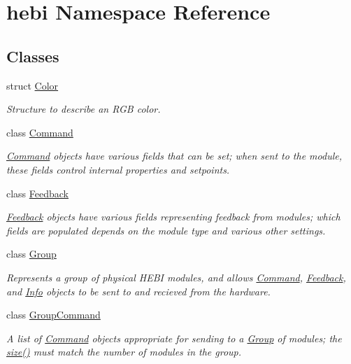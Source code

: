 \hypertarget{namespacehebi}{}\section{hebi Namespace Reference}
\label{namespacehebi}
\subsection*{Classes}
\begin{DoxyCompactItemize}
\item 
struct \hyperlink{structhebi_1_1Color}{Color}
\begin{DoxyCompactList}\small\item\em Structure to describe an R\+GB color. \end{DoxyCompactList}\item 
class \hyperlink{classhebi_1_1Command}{Command}
\begin{DoxyCompactList}\small\item\em \hyperlink{classhebi_1_1Command}{Command} objects have various fields that can be set; when sent to the module, these fields control internal properties and setpoints. \end{DoxyCompactList}\item 
class \hyperlink{classhebi_1_1Feedback}{Feedback}
\begin{DoxyCompactList}\small\item\em \hyperlink{classhebi_1_1Feedback}{Feedback} objects have various fields representing feedback from modules; which fields are populated depends on the module type and various other settings. \end{DoxyCompactList}\item 
class \hyperlink{classhebi_1_1Group}{Group}
\begin{DoxyCompactList}\small\item\em Represents a group of physical H\+E\+BI modules, and allows \hyperlink{classhebi_1_1Command}{Command}, \hyperlink{classhebi_1_1Feedback}{Feedback}, and \hyperlink{classhebi_1_1Info}{Info} objects to be sent to and recieved from the hardware. \end{DoxyCompactList}\item 
class \hyperlink{classhebi_1_1GroupCommand}{Group\+Command}
\begin{DoxyCompactList}\small\item\em A list of \hyperlink{classhebi_1_1Command}{Command} objects appropriate for sending to a \hyperlink{classhebi_1_1Group}{Group} of modules; the \hyperlink{classhebi_1_1GroupCommand_a75645b28175dde77de35801909d58213}{size()} must match the number of modules in the group. \end{DoxyCompactList}\item 

\end{DoxyCompactItemize}
